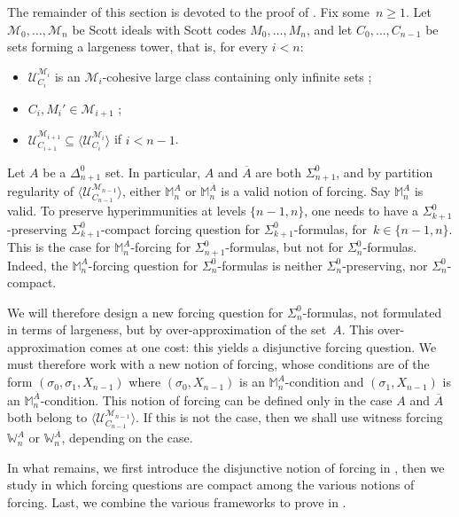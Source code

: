 \documentclass{article}
\def\NN{\mathbb{N}}
\def\WW{\mathbb{W}}
\def\MM{\mathbb{M}}
\def\U{\mathcal{U}}
\def\M{\mathcal{M}}
\numberwithin{theorem}{section}
\theoremstyle{definition}
\begin{document}
The remainder of this section is devoted to the proof of . Fix some~$n \geq 1$. Let $\M_0, \dots, \M_n$ be Scott ideals with Scott codes $M_0, \dots, M_n$, and let $C_0, \dots, C_{n-1}$ be sets forming a largeness tower, that is,  for every $i < n$:
\begin{itemize}
    \item $\U_{C_i}^{\M_i}$ is an $\M_i$-cohesive large class containing only infinite sets ;
    \item $C_i,M_i' \in \M_{i+1}$ ;
    \item $\U_{C_{i+1}}^{\M_{i+1}} \subseteq \langle \U_{C_i}^{\M_i} \rangle$ if $i < n-1$.
\end{itemize}
Let $A$ be a $\Delta^0_{n+1}$ set. In particular, $A$ and $\overline{A}$ are both $\Sigma^0_{n+1}$, and by partition regularity of $\langle \U_{C_{n-1}}^{\M_{n-1}} \rangle$, either $\MM^A_n$ or $\MM^{\overline{A}}_n$ is a valid notion of forcing. Say $\MM^A_n$ is valid. To preserve hyperimmunities at levels $\{n-1,n\}$, one needs to have a $\Sigma^0_{k+1}$-preserving $\Sigma^0_{k+1}$-compact forcing question for $\Sigma^0_{k+1}$-formulas, for~$k \in \{n-1, n\}$. This is the case for $\MM^A_n$-forcing for $\Sigma^0_{n+1}$-formulas, but not for $\Sigma^0_n$-formulas. Indeed, the $\MM^A_n$-forcing question for $\Sigma^0_n$-formulas is neither $\Sigma^0_n$-preserving, nor $\Sigma^0_n$-compact.

We will therefore design a new forcing question for $\Sigma^0_n$-formulas, not formulated in terms of largeness, but by over-approximation of the set~$A$. This over-approximation comes at one cost: this yields a disjunctive forcing question. We must therefore work with a new notion of forcing, whose conditions are of the form $(\sigma_0, \sigma_1, X_{n-1})$ where $(\sigma_0, X_{n-1})$ is an $\MM^A_n$-condition and $(\sigma_1, X_{n-1})$ is an $\MM^{\overline{A}}_n$-condition. This notion of forcing can be defined only in the case $A$ and $\overline{A}$ both belong to $\langle \U_{C_{n-1}}^{\M_{n-1}} \rangle$.
If this is not the case, then we shall use witness forcing $\WW^A_n$ or $\WW^{\overline{A}}_n$, depending on the case.

In what remains, we first introduce the disjunctive notion of forcing in , then we study in  which forcing questions are compact among the various notions of forcing. Last, we combine the various frameworks to prove  in .
\end{document}
